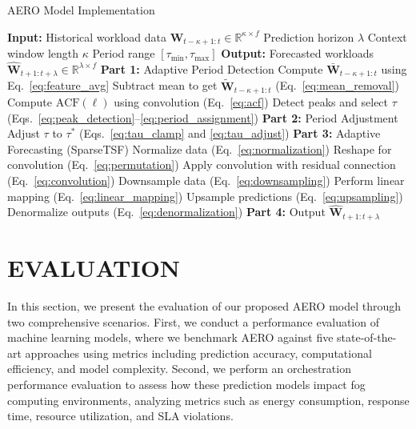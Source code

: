 \documentclass{ieeetmlcn}
\newcommand{\Part}[2]{\Statex\textbf{Part #1:} #2\Statex}
\begin{document}
\begin{algorithm}
\caption{AERO Model Implementation}
\label{alg:aero_impl}
\small
\begin{algorithmic}[1]
\Require
    \Statex \hspace{-1em}\textbf{Input:}
    \State Historical workload data $\mathbf{W}_{t-\kappa+1:t} \in \mathbb{R}^{\kappa \times f}$
    \State Prediction horizon $\lambda$
    \State Context window length $\kappa$
    \State Period range $[\tau_{\min}, \tau_{\max}]$
\Ensure
    \Statex \hspace{-1em}\textbf{Output:}
    \State Forecasted workloads $\hat{\mathbf{W}}_{t+1:t+\lambda} \in \mathbb{R}^{\lambda \times f}$
\Statex
\Part{1}{Adaptive Period Detection}
    \State Compute $\bar{\mathbf{W}}_{t-\kappa+1:t}$ using Eq.~\eqref{eq:feature_avg}
    \State Subtract mean to get $\tilde{\mathbf{W}}_{t-\kappa+1:t}$ \hfill {\small(Eq.~\eqref{eq:mean_removal})}
    \State Compute $\text{ACF}(\ell)$ using convolution \hfill {\small(Eq.~\eqref{eq:acf})}
    \State Detect peaks and select $\tau$ \hfill {\small(Eqs.~\eqref{eq:peak_detection}--\eqref{eq:period_assignment})}
\Statex
\Part{2}{Period Adjustment}
    \State Adjust $\tau$ to $\tau^{\ast}$ \hfill {\small(Eqs.~\eqref{eq:tau_clamp} and \eqref{eq:tau_adjust})}
\Statex
\Part{3}{Adaptive Forecasting (SparseTSF)}
    \State Normalize data \hfill {\small(Eq.~\eqref{eq:normalization})}
    \State Reshape for convolution \hfill {\small(Eq.~\eqref{eq:permutation})}
    \State Apply convolution with residual connection \hfill {\small(Eq.~\eqref{eq:convolution})}
    \State Downsample data \hfill {\small(Eq.~\eqref{eq:downsampling})}
    \State Perform linear mapping \hfill {\small(Eq.~\eqref{eq:linear_mapping})}
    \State Upsample predictions \hfill {\small(Eq.~\eqref{eq:upsampling})}
    \State Denormalize outputs \hfill {\small(Eq.~\eqref{eq:denormalization})}
\Statex
\Part{4}{Output}
    \State \Return $\hat{\mathbf{W}}_{t+1:t+\lambda}$
\end{algorithmic}
\end{algorithm}

\section{EVALUATION}

In this section, we present the evaluation of our proposed AERO model through two comprehensive scenarios. First, we conduct a performance evaluation of machine learning models, where we benchmark AERO against five state-of-the-art approaches using metrics including prediction accuracy, computational efficiency, and model complexity. Second, we perform an orchestration performance evaluation to assess how these prediction models impact fog computing environments, analyzing metrics such as energy consumption, response time, resource utilization, and SLA violations.
\end{document}
